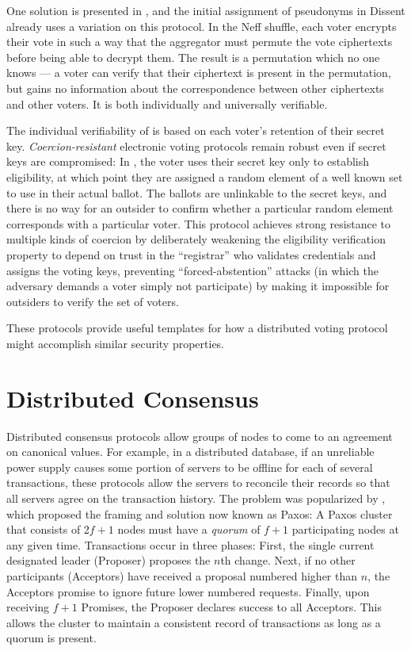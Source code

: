     One solution is presented in \cite{neff}, and the initial assignment of
    pseudonyms in Dissent already uses a variation on this protocol. In the Neff
    shuffle, each voter encrypts their vote in such a way that the aggregator
    must permute the vote ciphertexts before being able to decrypt them. The
    result is a permutation which no one knows --- a voter can verify that their
    ciphertext is present in the permutation, but gains no information about the
    correspondence between other ciphertexts and other voters. It is both
    individually and universally verifiable.

    The individual verifiability of \cite{neff} is based on each
    voter's retention of their secret key. \emph{Coercion-resistant} electronic
    voting protocols remain robust even if secret keys are compromised: In
    \cite{juels_coercion-resistant_2005}, the voter uses their secret key only
    to establish eligibility, at which point they are assigned a random element
    of a well known set to use in their actual ballot. The ballots are
    unlinkable to the secret keys, and there is no way for an outsider to
    confirm whether a particular random element corresponds with a particular
    voter. This protocol achieves strong resistance to multiple kinds of
    coercion by deliberately weakening the eligibility verification property to
    depend on trust in the ``registrar'' who validates credentials and assigns
    the voting keys, preventing ``forced-abstention'' attacks (in which the
    adversary demands a voter simply not participate) by making it impossible
    for outsiders to verify the set of voters.

    These protocols provide useful templates for how a distributed voting
    protocol might accomplish similar security properties.

  \section{Distributed Consensus}
    Distributed consensus protocols allow groups of nodes to come to an
    agreement on canonical values. For example, in a distributed database, if an
    unreliable power supply causes some portion of servers to be offline for
    each of several transactions, these protocols allow the
    servers to reconcile their records so that all servers agree on the
    transaction history. The problem was popularized by
    \cite{paxos}, which proposed the framing and solution now
    known as Paxos: A Paxos cluster that consists of 2$f+1$ nodes must have a
    \emph{quorum} of $f + 1$ participating nodes at any given time.
    Transactions occur in three phases: First, the single current designated
    leader (Proposer) proposes the $n$th change. Next, if no other participants
    (Acceptors) have received a proposal numbered higher than $n$, the Acceptors
    promise to ignore future lower numbered requests.  Finally, upon receiving
    $f+1$ Promises, the Proposer declares success to all Acceptors. This allows
    the cluster to maintain a consistent record of transactions as long as a
    quorum is present.


